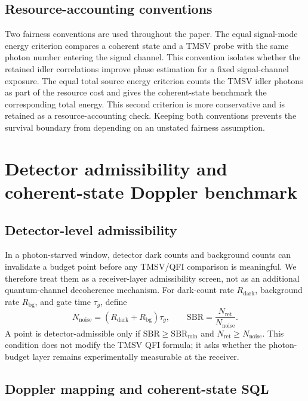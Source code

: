\documentclass[a4paper,11pt]{article}
\numberwithin{equation}{section}
\newcommand{\Nret}{N_{\mathrm{ret}}}
\newcommand{\SBR}{\mathrm{SBR}}
\begin{document}
\subsection{Resource-accounting conventions}
\label{subsec:resource_accounting}

Two fairness conventions are used throughout the paper. The equal signal-mode energy criterion compares a coherent state and a TMSV probe with the same photon number entering the signal channel. This convention isolates whether the retained idler correlations improve phase estimation for a fixed signal-channel exposure. The equal total source energy criterion counts the TMSV idler photons as part of the resource cost and gives the coherent-state benchmark the corresponding total energy. This second criterion is more conservative and is retained as a resource-accounting check. Keeping both conventions prevents the survival boundary from depending on an unstated fairness assumption.

\section{Detector admissibility and coherent-state Doppler benchmark}
\label{sec:benchmark}

\subsection{Detector-level admissibility}

In a photon-starved window, detector dark counts and background counts can invalidate a budget point before any TMSV/QFI comparison is meaningful. We therefore treat them as a receiver-layer admissibility screen, not as an additional quantum-channel decoherence mechanism. For dark-count rate $R_{\mathrm{dark}}$, background rate $R_{\mathrm{bg}}$, and gate time $\tau_g$, define
\begin{equation}
  N_{\mathrm{noise}}=(R_{\mathrm{dark}}+R_{\mathrm{bg}})\tau_g,
  \qquad
  \SBR=\frac{\Nret}{N_{\mathrm{noise}}}.
  \label{eq:sbr}
\end{equation}
A point is detector-admissible only if $\SBR\ge \SBR_{\min}$ and $\Nret\ge N_{\mathrm{noise}}$. This condition does not modify the TMSV QFI formula; it asks whether the photon-budget layer remains experimentally measurable at the receiver.

\subsection{Doppler mapping and coherent-state SQL}
\end{document}
